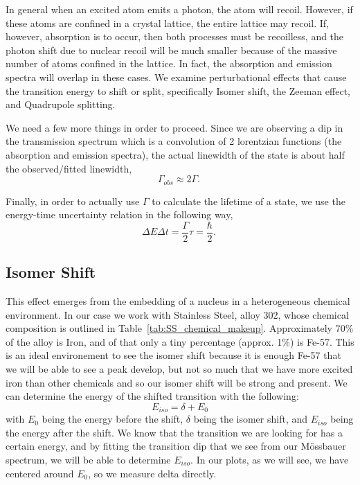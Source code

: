 \documentclass[reprint, nobibnotes, amssymb, amsmath, amsfonts, mathtools, mathrsfs, floatfix]{revtex4-1}
\newcommand{\moss}{M\"{o}ssbauer }
\begin{document}
    In general when an excited atom emits a photon, the atom will recoil.  However, if these atoms are confined in a crystal lattice, the entire lattice may recoil.  If, however, absorption is to occur, then both processes must be recoilless, and the photon shift due to nuclear recoil will be much smaller because of the massive number of atoms confined in the lattice.  In fact, the absorption and emission spectra will overlap in these cases.  We examine perturbational effects that cause the transition energy to shift or split, specifically Isomer shift, the Zeeman effect, and Quadrupole splitting.

    We need a few more things in order to proceed.  Since we are observing a dip in the transmission spectrum which is a convolution of 2 lorentzian functions (the absorption and emission spectra), the actual linewidth of the state is about half the observed/fitted linewidth,
    \begin{equation}
      \Gamma_{obs} \approx 2 \Gamma. ~\label{linewidths}
    \end{equation}

    Finally, in order to actually use $\Gamma$ to calculate the lifetime of a state, we use the energy-time uncertainty relation in the following way,
    \begin{equation}
      \Delta E \Delta t = \frac{\Gamma}{2}\tau = \frac{\hbar}{2}. ~\label{lifetimes}
    \end{equation}

    \subsection{Isomer Shift}
      This effect emerges from the embedding of a nucleus in a heterogeneous chemical environment.  In our case we work with Stainless Steel, alloy 302, whose chemical composition is outlined in Table~\ref{tab:SS_chemical_makeup}.  Approximately 70\% of the alloy is Iron, and of that only a tiny percentage (approx. 1\%) is Fe-57.  This is an ideal environement to see the isomer shift because it is enough Fe-57 that we will be able to see a peak develop, but not so much that we have more excited iron than other chemicals and so our isomer shift will be strong and present.  We can determine the energy of the shifted transition with the following:
      \begin{equation}
        E_{iso} = \delta + E_0 \label{isomer_shift}
      \end{equation}
      with $E_0$ being the energy before the shift, $\delta$ being the isomer shift, and $E_{iso}$ being the energy after the shift.  We know that the transition we are looking for has a certain energy, and by fitting the transition dip that we see from our \moss spectrum, we will be able to determine $E_{iso}$.  In our plots, as we will see, we have centered around $E_0$, so we measure delta directly.
\end{document}

